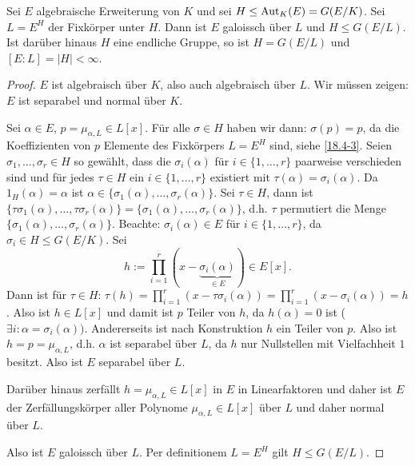 \begin{st}[Artin] \label{19.4-18}
	Sei $E$ algebraische Erweiterung von $K$ und sei $H \le \operatorname{Aut}_K(E) = G(E / K)$.
	Sei $L = E^H$ der Fixkörper unter $H$.
	Dann ist $E$ galoissch über $L$ und $H \le G(E / L)$.
	Ist darüber hinaus $H$ eine endliche Gruppe, so ist $H = G(E / L)$ und $[E : L] = |H| < \infty$.
	\begin{proof}
		$E$ ist algebraisch über $K$, also auch algebraisch über $L$.
		Wir müssen zeigen: $E$ ist separabel und normal über $K$.

		Sei $\alpha \in E$, $p = \mu_{\alpha, L} \in L[x]$.
		Für alle $\sigma \in H$ haben wir dann: $\sigma(p) = p$, da die Koeffizienten von $p$ Elemente des Fixkörpers $L = E^H$ sind, siehe \ref{18.4-3}.
		Seien $\sigma_1, \dotsc, \sigma_r \in H$ so gewählt, dass die $\sigma_i(\alpha)$ für $i \in \{1, \dotsc, r\}$ paarweise verschieden sind und für jedes $\tau \in H$ ein $i \in \{1, \dotsc, r\}$ existiert mit $\tau(\alpha) = \sigma_i(\alpha)$.
		Da $1_H(\alpha) = \alpha$ ist $\alpha \in \{\sigma_1(\alpha), \dotsc, \sigma_r(\alpha)\}$.
		Sei $\tau \in H$, dann ist $\{\tau\sigma_1(\alpha), \dotsc, \tau\sigma_r(\alpha)\} = \{ \sigma_1(\alpha), \dotsc, \sigma_r(\alpha) \}$, d.h. $\tau$ permutiert die Menge $\{\sigma_1(\alpha), \dotsc, \sigma_r(\alpha) \}$.
		Beachte: $\sigma_i(\alpha) \in E$ für $i \in \{1, \dotsc, r\}$, da $\sigma_i \in H \le G(E / K)$.
		Sei
		\[
			h := \prod_{i=1}^r (x - \underbrace{\sigma_i(\alpha)}_{\in E}) \in E[x].
		\]
		Dann ist für $\tau \in H$: $\tau(h) = \prod_{i=1}^r (x - \tau \sigma_i(\alpha))	= \prod_{i=1}^r (x - \sigma_i(\alpha)) = h$.
		Also ist $h \in L[x]$ und damit ist $p$ Teiler von $h$, da $h(\alpha) = 0$ ist ($\exists i: \alpha = \sigma_i(\alpha))$.
		Andererseits ist nach Konstruktion $h$ ein Teiler von $p$.
		Also ist $h = p = \mu_{\alpha, L}$, d.h. $\alpha$ ist separabel über $L$, da $h$ nur Nullstellen mit Vielfachheit $1$ besitzt.
		Also ist $E$ separabel über $L$.

		Darüber hinaus zerfällt $h = \mu_{\alpha, L} \in L[x]$ in $E$ in Linearfaktoren und daher ist $E$ der Zerfällungskörper aller Polynome $\mu_{\alpha, L} \in L[x]$ über $L$ und daher normal über $L$.

		Also ist $E$ galoissch über $L$.
		Per definitionem $L = E^H$ gilt $H \le G(E / L)$.


\end{proof}
\end{st}
